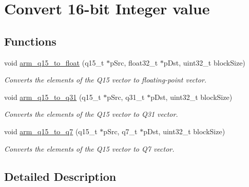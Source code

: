 \hypertarget{group__q15__to__x}{\section{Convert 16-\/bit Integer value}
\label{group__q15__to__x}
}
\subsection*{Functions}
\begin{DoxyCompactItemize}
\item 
void \hyperlink{group__q15__to__x_gaf8b0d2324de273fc430b0e61ad4e9eb2}{arm\-\_\-q15\-\_\-to\-\_\-float} (q15\-\_\-t $\ast$p\-Src, float32\-\_\-t $\ast$p\-Dst, uint32\-\_\-t block\-Size)
\begin{DoxyCompactList}\small\item\em Converts the elements of the Q15 vector to floating-\/point vector. \end{DoxyCompactList}\item 
void \hyperlink{group__q15__to__x_ga7ba2d87366990ad5380439e2b4a4c0a5}{arm\-\_\-q15\-\_\-to\-\_\-q31} (q15\-\_\-t $\ast$p\-Src, q31\-\_\-t $\ast$p\-Dst, uint32\-\_\-t block\-Size)
\begin{DoxyCompactList}\small\item\em Converts the elements of the Q15 vector to Q31 vector. \end{DoxyCompactList}\item 
void \hyperlink{group__q15__to__x_ga8fb31855ff8cce09c2ec9308f48ded69}{arm\-\_\-q15\-\_\-to\-\_\-q7} (q15\-\_\-t $\ast$p\-Src, q7\-\_\-t $\ast$p\-Dst, uint32\-\_\-t block\-Size)
\begin{DoxyCompactList}\small\item\em Converts the elements of the Q15 vector to Q7 vector. \end{DoxyCompactList}\end{DoxyCompactItemize}


\subsection{Detailed Description}


